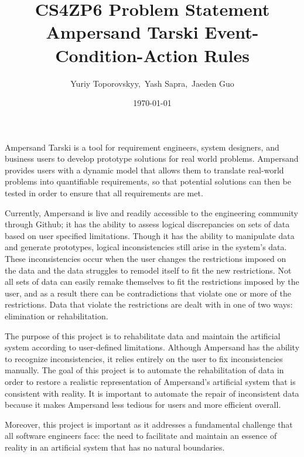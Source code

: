 \documentclass[12pt]{article}
\begin{document}
\title{CS4ZP6 Problem Statement \\ Ampersand Tarski Event-Condition-Action Rules } 
\author{Yuriy Toporovskyy,\ Yash Sapra,\ Jaeden Guo}
\date{\today}
\thispagestyle{empty}
\maketitle

Ampersand Tarski is a tool for requirement engineers, system designers, and 
business users to develop prototype solutions for real world problems. 
Ampersand provides users with a dynamic model that allows them to translate 
real-world problems into quantifiable requirements, so that potential solutions 
can then be tested in order to ensure that all requirements are met.

Currently, Ampersand is live and readily accessible to the engineering 
community through Github; it has the ability to assess logical discrepancies on 
sets of data based on user specified limitations. Though it has the ability to 
manipulate data and generate prototypes, logical inconsistencies still arise in 
the system’s data. These inconsistencies occur when the user changes the 
restrictions imposed on the data and the data struggles to remodel itself to 
fit the new restrictions. Not all sets of data can easily remake themselves to 
fit the restrictions imposed by the user, and as a result there can be 
contradictions that violate one or more of the restrictions. Data that violate 
the restrictions are dealt with in one of two ways: elimination or 
rehabilitation.

The purpose of this project is to rehabilitate data and maintain the artificial 
system according to user-defined limitations. Although Ampersand has the 
ability to recognize inconsistencies, it relies entirely on the user to fix 
inconsistencies manually. The goal of this project is to automate the 
rehabilitation of data in order to restore a realistic representation of 
Ampersand's artificial system that is consistent with reality. It is important 
to automate the repair of inconsistent data because it makes Ampersand less 
tedious for users and more efficient overall.  

Moreover, this project is important as it addresses a fundamental challenge 
that all software engineers face: the need to facilitate and maintain an 
essence of reality in an artificial system that has no natural boundaries.
\end{document}
